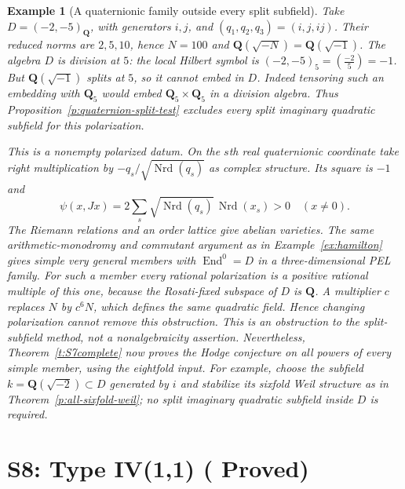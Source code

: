\documentclass[10pt,reqno]{article}
\theoremstyle{emphasizedplain}
\DeclareRobustCommand{\provedstatus}{%
  \texorpdfstring{\textcolor{ProvedGreen}{\textbf{Proved}}}{Proved}}
\theoremstyle{emphasizeddefinition}
\newtheorem{example}[theorem]{Example}
\theoremstyle{emphasizeddefinition}
\DeclareMathOperator{\End}{End}
\newcommand{\Q}{\mathbf Q}
\begin{document}
\begin{example}[A quaternionic family outside every split subfield]
\label{ex:quaternion-nonsplit}
Take $D=(-2,-5)_\Q$, with generators $i,j$, and
$(q_1,q_2,q_3)=(i,j,ij)$. Their reduced norms are $2,5,10$, hence
$N=100$ and $\Q(\sqrt{-N})=\Q(\sqrt{-1})$.
The algebra $D$ is division at $5$: the local Hilbert symbol is
$(-2,-5)_5=(\frac{-2}{5})=-1$. But $\Q(\sqrt{-1})$ splits at $5$,
so it cannot embed in $D$. Indeed tensoring such an embedding with
$\Q_5$ would embed $\Q_5\times\Q_5$ in a division algebra.
Thus Proposition~\ref{p:quaternion-split-test} excludes every split
imaginary quadratic subfield for this polarization.

This is a nonempty polarized datum. On the $s$th real quaternionic
coordinate take right multiplication by
$-q_s/\sqrt{\operatorname{Nrd}(q_s)}$ as complex structure. Its square
is $-1$ and
\[
 \psi(x,Jx)=2\sum_s\sqrt{\operatorname{Nrd}(q_s)}\,
                  \operatorname{Nrd}(x_s)>0\quad(x\ne0).
\]
The Riemann relations and an order lattice give abelian varieties.
The same arithmetic-monodromy and commutant argument as in
Example~\ref{ex:hamilton} gives simple very general members with
$\End^0=D$ in a three-dimensional PEL family.
For such a member every rational polarization is a positive rational
multiple of this one, because the Rosati-fixed subspace of $D$ is
$\Q$. A multiplier $c$ replaces $N$ by $c^6N$, which defines the
same quadratic field. Hence changing polarization cannot remove this
obstruction. This is an obstruction to the split-subfield method,
not a nonalgebraicity assertion. Nevertheless,
Theorem~\ref{t:S7complete} now proves the Hodge conjecture on all
powers of every simple member, using the eightfold input. For example,
choose the subfield $k=\Q(\sqrt{-2})\subset D$ generated by $i$ and stabilize its
sixfold Weil structure as in Theorem~\ref{p:all-sixfold-weil};
no split imaginary quadratic subfield inside $D$ is required.
\end{example}
\section{S8: Type IV(1,1) (\provedstatus)}\label{sec:S8}
\end{document}
